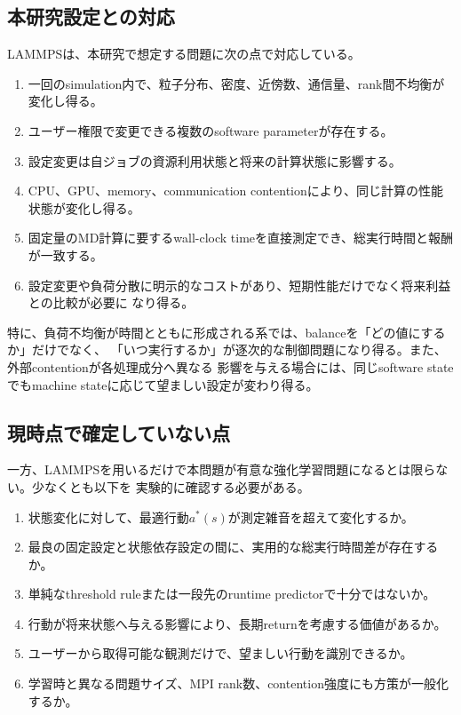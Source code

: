 \subsection{本研究設定との対応}

LAMMPSは、本研究で想定する問題に次の点で対応している。
\begin{enumerate}
  \item 一回のsimulation内で、粒子分布、密度、近傍数、通信量、rank間不均衡が変化し得る。
  \item ユーザー権限で変更できる複数のsoftware parameterが存在する。
  \item 設定変更は自ジョブの資源利用状態と将来の計算状態に影響する。
  \item CPU、GPU、memory、communication contentionにより、同じ計算の性能状態が変化し得る。
  \item 固定量のMD計算に要するwall-clock timeを直接測定でき、総実行時間と報酬が一致する。
  \item 設定変更や負荷分散に明示的なコストがあり、短期性能だけでなく将来利益との比較が必要に
        なり得る。
\end{enumerate}

特に、負荷不均衡が時間とともに形成される系では、balanceを「どの値にするか」だけでなく、
「いつ実行するか」が逐次的な制御問題になり得る。また、外部contentionが各処理成分へ異なる
影響を与える場合には、同じsoftware stateでもmachine stateに応じて望ましい設定が変わり得る。

\subsection{現時点で確定していない点}

一方、LAMMPSを用いるだけで本問題が有意な強化学習問題になるとは限らない。少なくとも以下を
実験的に確認する必要がある。
\begin{enumerate}
  \item 状態変化に対して、最適行動$a^*(s)$が測定雑音を超えて変化するか。
  \item 最良の固定設定と状態依存設定の間に、実用的な総実行時間差が存在するか。
  \item 単純なthreshold ruleまたは一段先のruntime predictorで十分ではないか。
  \item 行動が将来状態へ与える影響により、長期returnを考慮する価値があるか。
  \item ユーザーから取得可能な観測だけで、望ましい行動を識別できるか。
  \item 学習時と異なる問題サイズ、MPI rank数、contention強度にも方策が一般化するか。
\end{enumerate}

